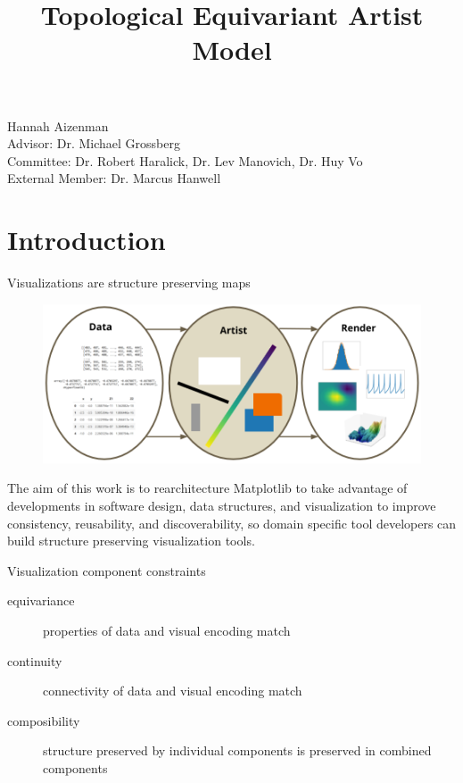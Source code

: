 \documentclass[xcolor={dvipsnames}, handout]{beamer}
\begin{document}
\title{Topological Equivariant Artist Model}

\begin{frame}
	\titlepage
    Hannah Aizenman\\
    Advisor: Dr. Michael Grossberg \\
    Committee: Dr. Robert Haralick, Dr. Lev Manovich, Dr. Huy Vo\\
    External Member: Dr. Marcus Hanwell
\end{frame}

\section{Introduction}

\begin{frame}{Visualizations are structure preserving maps}
    \begin{figure}
        \includegraphics[width=1\linewidth]{figures/intro/dar.png}
    \end{figure}
    The aim of this work is to rearchitecture Matplotlib
    \pause 
    to take advantage of developments in software design, data structures, and visualization
    \pause
    to improve consistency, reusability, and discoverability,
    \pause
    so domain specific tool developers can build structure preserving visualization tools.
\end{frame}

\begin{frame}{Visualization component constraints}
    \begin{description}
        \item[equivariance] properties of data and visual encoding match
        \item[continuity] connectivity of data and visual encoding match
        \item[composibility] structure preserved by individual components is preserved in combined components
    \end{description}
\end{frame}
\end{document}
